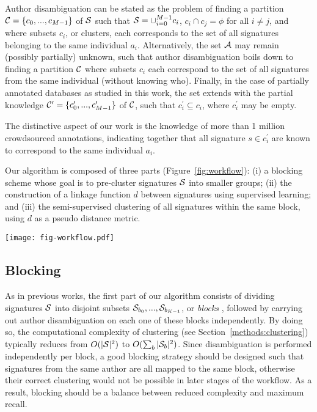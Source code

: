 \documentclass[runningheads,a4paper]{llncs}
\begin{document}
Author disambiguation can be stated as the problem of
finding a partition ${\cal C} = \{ c_0, ..., c_{M-1} \}$ of ${\cal S}$ such
that ${\cal S} = \cup_{i=0}^{M-1} c_i$, $c_i \cap c_j = \phi$ for all $i \neq
j$, and where subsets $c_i$, or clusters, each corresponds to the set of all
signatures belonging to the same individual $a_i$. Alternatively, the set
${\cal A}$ may remain (possibly partially) unknown, such that author
disambiguation boils down to finding a partition ${\cal C}$ where
subsets $c_i$  each correspond to the set of all signatures from the same
individual (without knowing who). Finally, in the case of partially annotated databases as studied in
this work, the set extends with the partial knowledge ${\cal C}^\prime = \{ c_0^\prime, ..., c_{M-1}^\prime \}$ of ${\cal C}$,
such that $c_i^\prime \subseteq c_i$, where $c_i^\prime$ may be empty.

The distinctive aspect of our work is the
knowledge of more than 1 million crowdsourced annotations, indicating together that all signature $s \in
c_i^\prime$ are known to correspond to the same individual $a_i$.

Our algorithm is composed of three parts (Figure~\ref{fig:workflow}): (i) a blocking
scheme whose goal is to pre-cluster signatures ${\cal S}$ into smaller groups; (ii) the construction of a linkage function
$d$ between signatures using supervised learning; and (iii) the
semi-supervised clustering of all signatures within the same block, using $d$ as a pseudo distance metric.


\begin{figure*}
\centering
\texttt{[image: fig-workflow.pdf]}
\caption{Pipeline for author disambiguation: (a)
signatures are \textit{blocked} to reduce computational complexity, (b) a linkage
function is built with supervised learning, (c) independently within each block, signatures
are grouped using hierarchical agglomerative clustering.}
\label{fig:workflow}
\end{figure*}

\subsection{Blocking}
\label{methods:blocking}

As in previous works, the first part of our algorithm consists of dividing
signatures ${\cal S}$ into disjoint subsets ${\cal S}_{b_0}, ..., {\cal
S}_{b_{K-1}}$, or \textit{blocks} \cite{fellegi69}, followed by carrying out
author disambiguation on each one of these blocks independently.
By doing so, the computational complexity of clustering (see Section~\ref{methods:clustering})
typically reduces from $O(|{\cal S}|^2)$ to $O(\sum_b |{\cal S}_b|^2)$.
Since disambiguation is performed independently per block, a good blocking strategy should be
designed such that signatures from the same author are all mapped to the same
block, otherwise their correct clustering would not be possible in later stages of the workflow.
As a result, blocking should be a balance between reduced complexity and maximum recall.
\end{document}
